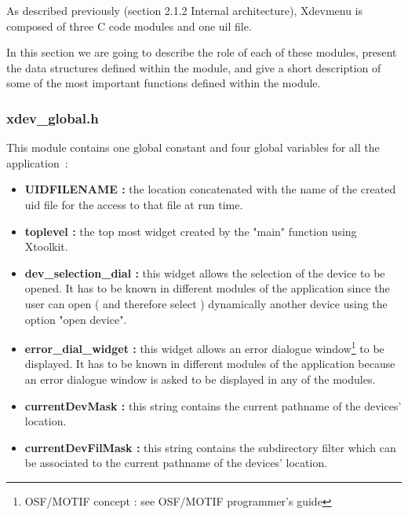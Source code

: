 %
%
%
%
%
%
%
%
%
%
As described previously (section 2.1.2 Internal architecture), Xdevmenu is 
composed of three C code modules and one uil file.

In this section we are going to describe the role of each of these modules,
present the data structures defined within the module, and give a short
description of some of the most important functions defined within the module.

\subsubsection{xdev\_global.h}
This module contains one global constant and four global variables for all the 
application~:
\begin {itemize}
\item {\bf UIDFILENAME : } 
the location concatenated with the name of the created uid 
file for the access to that file at run time.

\item {\bf toplevel : } 
the top most widget created by the "main" function using Xtoolkit.

\item {\bf dev\_selection\_dial : } 
this widget allows the selection of the device to be opened. It has to be known in 
different modules of the application since the user can open ( and therefore select ) 
dynamically another device using the option "open device". 

\item {\bf error\_dial\_widget : } 
this widget allows an error dialogue window\footnote[1]{ OSF/MOTIF concept : see OSF/MOTIF programmer's guide } 
to be displayed. It has to be known in different modules of the application because
an error dialogue window is asked to be displayed in any of the modules.

\item {\bf currentDevMask : } this string contains the current pathname of the devices' location.

\item {\bf currentDevFilMask : } 
this string contains the subdirectory filter which can be associated to the current pathname of the devices' location.
\end {itemize}


